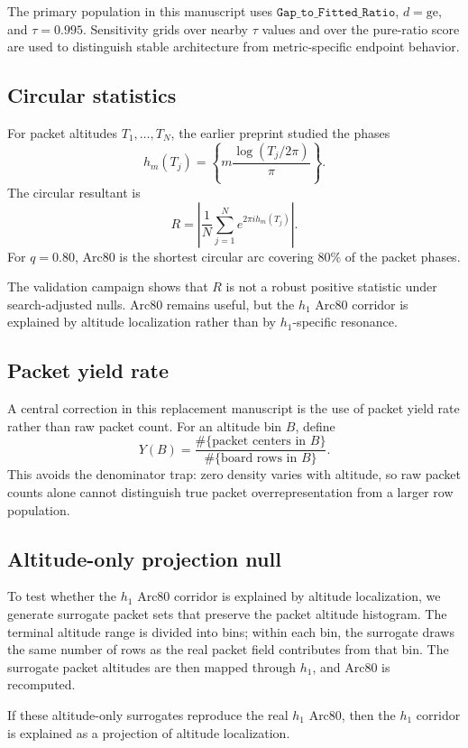 \documentclass[11pt]{article}
\begin{document}
The primary population in this manuscript uses \(\texttt{Gap\_to\_Fitted\_Ratio}\), \(d=\mathrm{ge}\), and \(\tau=0.995\). Sensitivity grids over nearby \(\tau\) values and over the pure-ratio score are used to distinguish stable architecture from metric-specific endpoint behavior.

\subsection{Circular statistics}

For packet altitudes \(T_1,\ldots,T_N\), the earlier preprint studied the phases
\[
h_m(T_j)=\left\{m\frac{\log(T_j/2\pi)}{\pi}\right\}.
\]
The circular resultant is
\[
R=\left|\frac{1}{N}\sum_{j=1}^N e^{2\pi i h_m(T_j)}\right|.
\]
For \(q=0.80\), Arc80 is the shortest circular arc covering \(80\%\) of the packet phases.

The validation campaign shows that \(R\) is not a robust positive statistic under search-adjusted nulls. Arc80 remains useful, but the \(h_1\) Arc80 corridor is explained by altitude localization rather than by \(h_1\)-specific resonance.

\subsection{Packet yield rate}

A central correction in this replacement manuscript is the use of packet yield rate rather than raw packet count. For an altitude bin \(B\), define
\[
Y(B)=\frac{\#\{\text{packet centers in }B\}}{\#\{\text{board rows in }B\}}.
\]
This avoids the denominator trap: zero density varies with altitude, so raw packet counts alone cannot distinguish true packet overrepresentation from a larger row population.

\subsection{Altitude-only projection null}

To test whether the \(h_1\) Arc80 corridor is explained by altitude localization, we generate surrogate packet sets that preserve the packet altitude histogram. The terminal altitude range is divided into bins; within each bin, the surrogate draws the same number of rows as the real packet field contributes from that bin. The surrogate packet altitudes are then mapped through \(h_1\), and Arc80 is recomputed.

If these altitude-only surrogates reproduce the real \(h_1\) Arc80, then the \(h_1\) corridor is explained as a projection of altitude localization.
\end{document}

